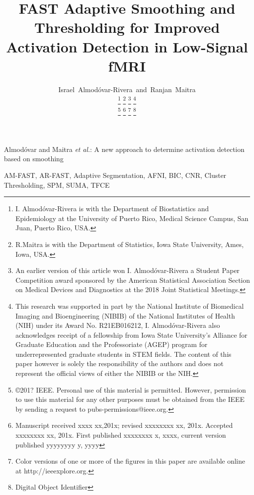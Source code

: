 \documentclass[journal,peerreview,nodraftcls]{IEEEtran}
\begin{document}
\title{FAST Adaptive Smoothing and Thresholding for Improved
  Activation Detection in Low-Signal fMRI}
\author{Israel~Almod\'ovar-Rivera~and~Ranjan~Maitra%


  \thanks{I. Almod\'ovar-Rivera is with the Department of
    Biostatistics and Epidemiology at the University of Puerto Rico,
    Medical Science Campus, San Juan, Puerto Rico, USA.}
  \thanks{R.Maitra is with the Department of Statistics, Iowa State
    University, Ames, Iowa, USA.}
   \thanks{An earlier version of this article won
     I. Almod\'ovar-Rivera a  Student Paper Competition
     award sponsored by the  American Statistical Association Section
     on Medical Devices and Diagnostics at the 2018 Joint Statistical Meetings.}
   \thanks{This research was supported in part by the
    National Institute of Biomedical Imaging and Bioengineering (NIBIB) of the National
Institutes of Health (NIH) under its Award No. R21EB016212,
I. Almod\'ovar-Rivera also acknowledges receipt of a fellowship from 
Iowa State University's Alliance for Graduate Education and the
Professoriate (AGEP) program for underrepresented graduate students
in STEM fields. The content of this paper however is solely the responsibility of the 
authors and does not represent the official views of either the
NIBIB or the NIH.} 

\thanks{\copyright 201? IEEE. Personal use of this material is
  permitted. However, permission to use this material for any other
  purposes must be obtained from the IEEE by sending a request to
  pubs-permissions@ieee.org.}
\thanks{Manuscript received xxxx xx,201x; revised xxxxxxxx xx,
  201x. Accepted xxxxxxxx xx, 201x.
  First published xxxxxxxx x, xxxx, current version published
  yyyyyyyy y, yyyy}
\thanks{Color versions of one or more of the figures in this paper are
  available online at http://ieeexplore.org.} 
\thanks{Digital Object Identifier}
}

%
{Almod\'ovar and Maitra \MakeLowercase{\textit{et al.}}: A new approach to determine activation detection based on smoothing}

\maketitle



\begin{IEEEkeywords}
  AM-FAST, AR-FAST, Adaptive Segmentation, AFNI, BIC, CNR,
  Cluster Thresholding, SPM, SUMA, TFCE
\end{IEEEkeywords}
\end{document}
